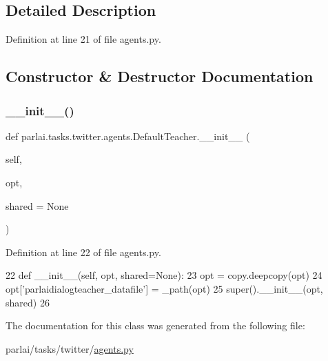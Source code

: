 \subsection{Detailed Description}


Definition at line 21 of file agents.\+py.



\subsection{Constructor \& Destructor Documentation}
\mbox{\label{classparlai_1_1tasks_1_1twitter_1_1agents_1_1DefaultTeacher_a6351654c7d50fa7c723a2d38bd00d0d8}} 
\subsubsection{\texorpdfstring{\+\_\+\+\_\+init\+\_\+\+\_\+()}{\_\_init\_\_()}}
{\footnotesize\ttfamily def parlai.\+tasks.\+twitter.\+agents.\+Default\+Teacher.\+\_\+\+\_\+init\+\_\+\+\_\+ (\begin{DoxyParamCaption}\item[{}]{self,  }\item[{}]{opt,  }\item[{}]{shared = {\ttfamily None} }\end{DoxyParamCaption})}



Definition at line 22 of file agents.\+py.


\begin{DoxyCode}
22     \textcolor{keyword}{def }\_\_init\_\_(self, opt, shared=None):
23         opt = copy.deepcopy(opt)
24         opt[\textcolor{stringliteral}{'parlaidialogteacher\_datafile'}] = \_path(opt)
25         super().\_\_init\_\_(opt, shared)
26 \end{DoxyCode}


The documentation for this class was generated from the following file\+:\begin{DoxyCompactItemize}
\item 
parlai/tasks/twitter/\hyperlink{parlai_2tasks_2twitter_2agents_8py}{agents.\+py}\end{DoxyCompactItemize}
